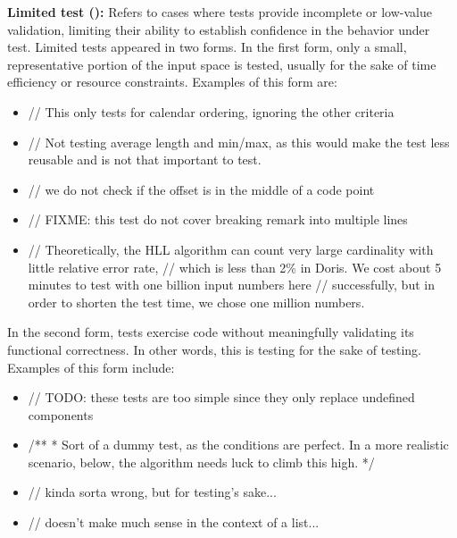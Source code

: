 \textbf{Limited test (\limitedTestCount{}):} Refers to cases where tests provide incomplete or low-value validation, limiting their ability to establish confidence in the behavior under test. Limited tests appeared in two forms. In the first form, only a small, representative portion of the input space is tested, usually for the sake of time efficiency or resource constraints. Examples of this form are:
\begin{itemize}[itemsep=-2pt]
    \item \textcolor{commentColor}{// This only tests for calendar ordering, ignoring the other criteria}
    \item \textcolor{commentColor}{// Not testing average length and min/max, as this would make the test less reusable and is not that important to test.}
    \item \textcolor{commentColor}{// we do not check if the offset is in the middle of a code point}
    \item \textcolor{commentColor}{// FIXME: this test do not cover breaking remark into multiple lines}
    \item \textcolor{commentColor}{// Theoretically, the HLL algorithm can count very large cardinality with little relative error rate,
    // which is less than 2\% in Doris. We cost about 5 minutes to test with one billion input numbers here
    // successfully, but in order to shorten the test time, we chose one million numbers.}
\end{itemize}


In the second form, tests exercise code without meaningfully validating its functional correctness. In other words, this is testing for the sake of testing. Examples of this form include:


\begin{itemize}[itemsep=-2pt]
     \item \textcolor{commentColor}{// TODO: these tests are too simple since they only replace undefined components}
    \item \textcolor{commentColor}{/**
 * Sort of a dummy test, as the conditions are perfect. In a more realistic scenario, below, the algorithm needs luck to climb this high.
 */}
 \item \textcolor{commentColor}{// kinda sorta wrong, but for testing's sake...}
 \item \textcolor{commentColor}{// doesn't make much sense in the context of a list...}
\end{itemize}


